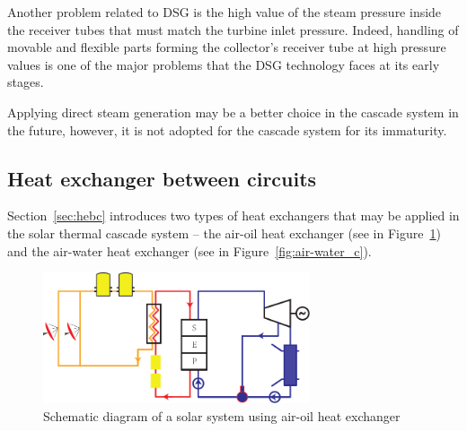 Another problem related to DSG is the high value of the steam pressure inside the receiver tubes that must match the turbine inlet pressure. 
Indeed, handling of movable and flexible parts forming the collector's receiver tube at high pressure values is one of the major problems that the DSG technology faces at its early stages.

Applying direct steam generation may be a better choice in the cascade system in the future, however, it is not adopted for the cascade system for its immaturity.

\subsection{Heat exchanger between circuits}

Section~\ref{sec:hebc} introduces two types of heat exchangers that may be applied in the solar thermal cascade system -- the air-oil heat exchanger (see in Figure~\ref{fig:air-oil_c}) and the air-water heat exchanger (see in Figure~\ref{fig:air-water_c}). 

\begin{figure}[h]
\centering 
\includegraphics[width=0.7\textwidth]{fig/air-oil}
\caption{Schematic diagram of a solar system using air-oil heat exchanger}\label{fig:air-oil_c}
\end{figure}

